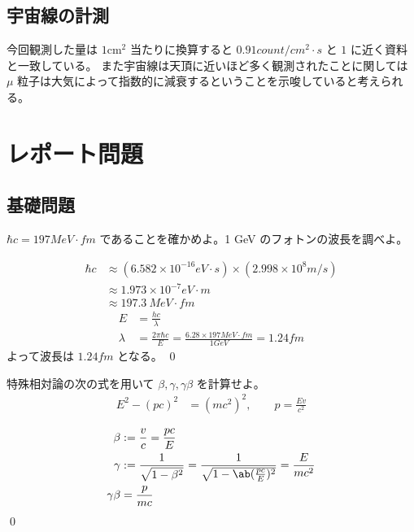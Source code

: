 \documentclass[uplatex,dvipdfmx,a4paper,11pt]{jlreq}
\makeatletter
\numberwithin{equation}{section}
\theoremstyle{definition}
\renewenvironment{proof}[1][\proofname]{\par
  \normalfont
  \topsep6\p@\@plus6\p@ \trivlist
  \item[\hskip\labelsep{\bfseries #1}\@addpunct{\bfseries}]\ignorespaces\quad\par
}{%
  \qed\endtrivlist\@endpefalse
}
\renewcommand\proofname{証明}
\makeatother
\begin{document}
\subsection{宇宙線の計測}
今回観測した量は $1\si{\cm^2}$ 当たりに換算すると $0.91\si{count/cm^2\cdot s}$ と $1$ に近く資料と一致している。
また宇宙線は天頂に近いほど多く観測されたことに関しては $\mu$ 粒子は大気によって指数的に減衰するということを示唆していると考えられる。



\section{レポート問題}
\subsection{基礎問題}
\begin{problem}[準備 1]
$\hbar c = 197\si{MeV\cdot fm}$ であることを確かめよ。1 \si{GeV} のフォトンの波長を調べよ。
\end{problem}
\begin{proof}
  \begin{align}
    \hbar c & \approx (6.582 \times 10^{-16} \si{eV\cdot s}) \times (2.998\times 10^8 \si{m/s}) \\
            & \approx 1.973\times 10^{-7}\si{eV\cdot m}                                         \\
            & \approx 197.3\ \si{MeV\cdot fm}
  \end{align}
  \begin{align}
    E       & = \frac{hc}{\lambda}                                                                      \\
    \lambda & = \frac{2\pi\hbar c}{E} = \frac{6.28\times 197\si{MeV\cdot fm}}{1 \si{GeV}} = 1.24\si{fm}
  \end{align}
  よって波長は $1.24\si{fm}$ となる。
\end{proof}

\begin{problem}
特殊相対論の次の式を用いて $\beta, \gamma, \gamma\beta$ を計算せよ。
\begin{align}
  E^2 - (pc)^2 & = (mc^2)^2, \qquad p = \frac{Ev}{c^2}
\end{align}
\end{problem}
\begin{proof}
  \begin{align}
    \beta       & := \frac{v}{c} = \frac{pc}{E}                                                               \\
    \gamma      & := \frac{1}{\sqrt{1 - \beta^2}} = \frac{1}{\sqrt{1 - \ab(\frac{pc}{E})^2}} = \frac{E}{mc^2} \\
    \gamma\beta & = \frac{p}{mc}
  \end{align}
\end{proof}
\end{document}
